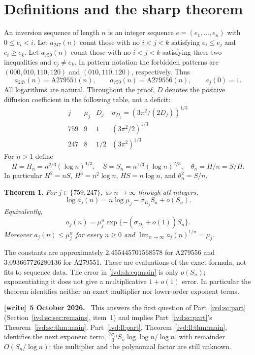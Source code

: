\documentclass[11pt,letterpaper]{article}
\newtheorem{theorem}{Theorem}[section]
\theoremstyle{remark}\newtheorem{remark}[theorem]{Remark}
\numberwithin{equation}{section}
\newenvironment{writenote}[1][]{\par\smallskip\begingroup\small
 \noindent\textbf{[write]}\if\relax\detokenize{#1}\relax\else~\textbf{#1.}\fi\ }%
 {\par\endgroup\smallskip}
\begin{document}
\section{Definitions and the sharp theorem}\label{ivd:sh:sec:main}
An inversion sequence of length $n$ is an integer sequence
$e=(e_1,\ldots,e_n)$ with $0\le e_i<i$. Let $a_{247}(n)$ count those
with no $i<j<k$ satisfying $e_i\le e_j$ and $e_i\ge e_k$.
Let $a_{759}(n)$ count those with no $i<j<k$ satisfying these two
inequalities and $e_j\ne e_k$. In pattern notation the forbidden
patterns are $(000,010,110,120)$ and $(010,110,120)$, respectively.
Thus
\[
 a_{247}(n)=\mathrm{A279551}(n),\qquad
 a_{759}(n)=\mathrm{A279556}(n),\qquad a_j(0)=1.
\]
All logarithms are natural. Throughout the proof, $D$ denotes the
positive diffusion coefficient in the following table, not a deficit:
\[
\begin{array}{c|ccc}
 j&\mu_j&D_j&\sigma_{D_j}=(3\pi^2/(2D_j))^{1/3}\\\hline
 759&9&1&(3\pi^2/2)^{1/3}\\
 247&8&1/2&(3\pi^2)^{1/3}
\end{array}
\]
For $n>1$ define
\begin{equation}\label{ivd:sh:eq:scales}
 H=H_n=n^{2/3}(\log n)^{1/3},\quad
 S=S_n=n^{1/3}(\log n)^{2/3},\quad
 \theta_n=H/n=S/H.
\end{equation}
In particular $H^2=nS$, $H^3=n^2\log n$, $HS=n\log n$,
and $\theta_n^2=S/n$.
\begin{theorem}\label{ivd:sh:thm:main}
For $j\in\{759,247\}$, as $n\to\infty$ through all integers,
\begin{equation}\label{ivd:sh:eq:main}
 \log a_j(n)=n\log\mu_j-\sigma_{D_j}S_n+o(S_n).
\end{equation}
Equivalently,
\[
 a_j(n)=\mu_j^n\exp\{-(\sigma_{D_j}+o(1))S_n\}.
\]
Moreover $a_j(n)\le\mu_j^n$ for every $n\ge0$ and
$\lim_{n\to\infty}a_j(n)^{1/n}=\mu_j$.
\end{theorem}
The constants are approximately $2.455445701568578$ for A279556 and
$3.093667726280136$ for A279551. These are evaluations of the exact
formula, not fits to sequence data. The error in \eqref{ivd:sh:eq:main} is
only $o(S_n)$; exponentiating it does not give a multiplicative
$1+o(1)$ error. In particular the theorem identifies neither an exact
multiplier nor lower-order exponent terms.
\begin{writenote}[5 October 2026]
This answers the first question of Part~\ref{ivd:sc:part} (Section~\ref{ivd:sc:sec:remains}, item~1) and implies Part~\ref{ivd:sc:part}'s Theorem~\ref{ivd:sc:thm:main}. Part~\ref{ivd:ll:part}, Theorem~\ref{ivd:ll:thm:main}, identifies the next exponent term, $\frac{7\sigma_D}3S_n\log\log n/\log n$, with remainder $O(S_n/\log n)$; the multiplier and the polynomial factor are still unknown.
\end{writenote}
\end{document}
